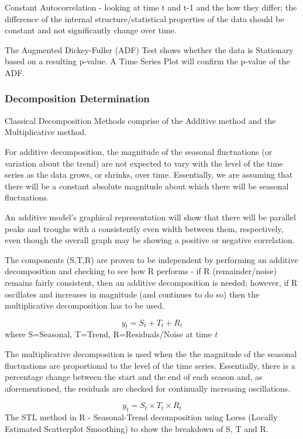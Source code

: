 \documentclass[
  letterpaper,
  DIV=11,
  numbers=noendperiod]{scrartcl}
\begin{document}
Constant Autocorrelation - looking at time t and t-1 and the how they
differ; the difference of the internal structure/statistical properties
of the data should be constant and not significantly change over time.

The Augmented Dickey-Fuller (ADF) Test shows whether the data is
Stationary based on a resulting p-value. A Time Series Plot will confirm
the p-value of the ADF.

\subsubsection{Decomposition
Determination}\label{decomposition-determination}

Classical Decomposition Methods comprise of the Additive method and the
Multiplicative method.

For additive decomposition, the magnitude of the seasonal fluctuations
(or variation about the trend) are not expected to vary with the level
of the time series as the data grows, or shrinks, over time.
Essentially, we are assuming that there will be a constant absolute
magnitude about which there will be seasonal fluctuations.

An additive model's graphical representation will show that there will
be parallel peaks and troughs with a consistently even width between
them, respectively, even though the overall graph may be showing a
positive or negative correlation.

The components (S,T,R) are proven to be independent by performing an
additive decomposition and checking to see how R performs - if R
(remainder/noise) remains fairly consistent, then an additive
decomposition is needed; however, if R oscillates and increases in
magnitude (and continues to do so) then the multiplicative decomposition
has to be used.

\[ 
    y_t = S_t + T_t + R_t 
\] where S=Seasonal, T=Trend, R=Residuals/Noise at time \emph{t}

The multiplicative decomposition is used when the the magnitude of the
seasonal fluctuations are proportional to the level of the time series.
Essentially, there is a percentage change between the start and the end
of each season and, as aforementioned, the residuals are checked for
continually increasing oscillations.

\[ 
    y_t = S_t \times T_t \times R_t 
\] The STL method in R - Seasonal-Trend decomposition using Loess
(Locally Estimated Scatterplot Smoothing) to show the breakdown of S, T
and R.
\end{document}
